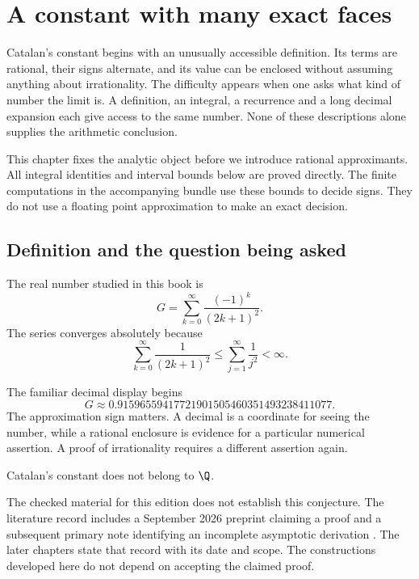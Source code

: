 \chapter{A constant with many exact faces}
\label{ch:constant}

Catalan's constant begins with an unusually accessible definition. Its terms are rational, their signs alternate, and its value can be enclosed without assuming anything about irrationality. The difficulty appears when one asks what kind of number the limit is. A definition, an integral, a recurrence and a long decimal expansion each give access to the same number. None of these descriptions alone supplies the arithmetic conclusion.

This chapter fixes the analytic object before we introduce rational approximants. All integral identities and interval bounds below are proved directly. The finite computations in the accompanying bundle use these bounds to decide signs. They do not use a floating point approximation to make an exact decision.

\section{Definition and the question being asked}

\begin{definition}
\label{def:c01-G}
The real number studied in this book is
\begin{equation}
G=\sum_{k=0}^{\infty}\frac{(-1)^k}{(2k+1)^2}.
\label{eq:c01-definition}
\end{equation}
The series converges absolutely because
\[
\sum_{k=0}^{\infty}\frac1{(2k+1)^2}
\leq\sum_{j=1}^{\infty}\frac1{j^2}<\infty.
\]
\end{definition}

The familiar decimal display begins
\[
G\approx0.91596559417721901505460351493238411077.
\]
The approximation sign matters. A decimal is a coordinate for seeing the number, while a rational enclosure is evidence for a particular numerical assertion. A proof of irrationality requires a different assertion again.

\begin{conjecture}
\label{conj:c01-irrationality}
Catalan's constant does not belong to $\Q$.
\end{conjecture}

The checked material for this edition does not establish this conjecture. The literature record includes a September 2026 preprint claiming a proof and a subsequent primary note identifying an incomplete asymptotic derivation \cite{Sun2026,Wachs2026}. The later chapters state that record with its date and scope. The constructions developed here do not depend on accepting the claimed proof.

